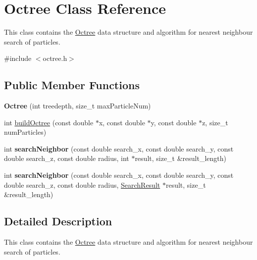 \hypertarget{classOctree}{\section{Octree Class Reference}
\label{classOctree}
}


This class contains the \hyperlink{classOctree}{Octree} data structure and algorithm for nearest neighbour search of particles.  




{\ttfamily \#include $<$octree.\-h$>$}

\subsection*{Public Member Functions}
\begin{DoxyCompactItemize}
\item 
\hypertarget{classOctree_ab357c57a94cc06c3b31206b92b52dd01}{{\bfseries Octree} (int treedepth, size\-\_\-t max\-Particle\-Num)}\label{classOctree_ab357c57a94cc06c3b31206b92b52dd01}

\item 
int \hyperlink{classOctree_afca0e9d681795da46f2fbfb24894be6c}{build\-Octree} (const double $\ast$x, const double $\ast$y, const double $\ast$z, size\-\_\-t num\-Particles)
\item 
\hypertarget{classOctree_a2dd2fcfd44f50ac39fcf8320861efcd4}{int {\bfseries search\-Neighbor} (const double search\-\_\-x, const double search\-\_\-y, const double search\-\_\-z, const double radius, int $\ast$result, size\-\_\-t \&result\-\_\-length)}\label{classOctree_a2dd2fcfd44f50ac39fcf8320861efcd4}

\item 
\hypertarget{classOctree_aa04260035f1e0fceb840f637330eda78}{int {\bfseries search\-Neighbor} (const double search\-\_\-x, const double search\-\_\-y, const double search\-\_\-z, const double radius, \hyperlink{structSearchResult}{Search\-Result} $\ast$result, size\-\_\-t \&result\-\_\-length)}\label{classOctree_aa04260035f1e0fceb840f637330eda78}

\end{DoxyCompactItemize}


\subsection{Detailed Description}
This class contains the \hyperlink{classOctree}{Octree} data structure and algorithm for nearest neighbour search of particles. 


